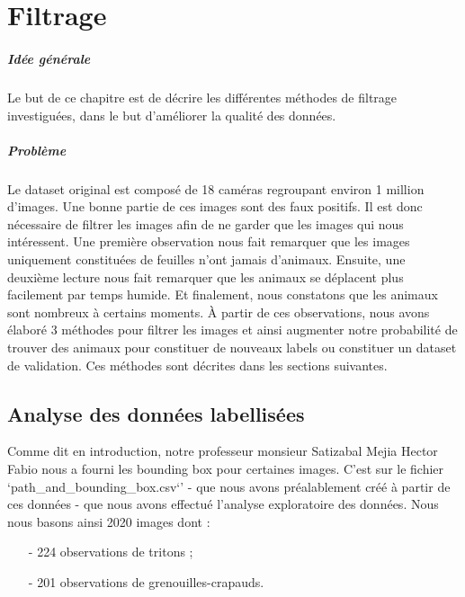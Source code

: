 \chapter{Filtrage}

\paragraph*{Idée générale}
Le but de ce chapitre est de décrire les différentes méthodes de filtrage investiguées, dans le but d'améliorer la qualité des données.

\paragraph*{Problème}
Le dataset original est composé de 18 caméras regroupant environ 1 million d'images. Une bonne partie de ces images sont des faux positifs. Il est donc nécessaire de filtrer les images afin de ne garder que les images qui nous intéressent. Une première observation nous fait remarquer que les images uniquement constituées de feuilles n'ont jamais d'animaux. Ensuite, une deuxième lecture nous fait remarquer que les animaux se déplacent plus facilement par temps humide. Et finalement, nous constatons que les animaux sont nombreux à certains moments. À partir de ces observations, nous avons élaboré 3 méthodes pour filtrer les images et ainsi augmenter notre probabilité de trouver des animaux pour constituer de nouveaux labels ou constituer un dataset de validation.
Ces méthodes sont décrites dans les sections suivantes.


\section{Analyse des données labellisées}

Comme dit en introduction, notre professeur monsieur Satizabal Mejia Hector Fabio nous a fourni les bounding box pour certaines images. C'est sur le fichier `path\_and\_bounding\_box.csv`' - que nous avons préalablement créé à partir de ces données - que nous avons effectué l'analyse exploratoire des données. Nous nous basons ainsi 2020 images dont :

\begin{enumerate}
    \item[-] 224 observations de tritons ;
    \item[-] 201 observations de grenouilles-crapauds.
\end{enumerate}

